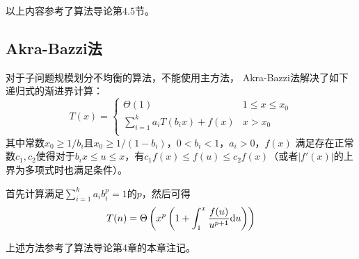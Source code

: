 以上内容参考了算法导论\cite{ITA3}第4.5节。
\subsection{Akra-Bazzi法}
对于子问题规模划分不均衡的算法，不能使用主方法，
Akra-Bazzi法解决了如下递归式的渐进界计算：
\begin{displaymath}
	T(x)=\left\{\begin{array}{ll}
		\Theta(1)                     & 1\leq x \leq x_0 \\
		\sum_{i=1}^k{a_iT(b_ix)}+f(x) & x>x_0            \\
	\end{array}\right.
\end{displaymath}
其中常数$x_0\geq 1/b_i$且$x_0 \geq 1/(1-b_i)$，$0<b_i<1$，$a_i>0$，$f(x)$
满足存在正常数$c_1,c_2$使得对于$b_ix\leq u \leq x$，有$c_1f(x)\leq f(u)
	\leq c_2f(x)$（或者$|f'(x)|$的上界为多项式时也满足条件）。

首先计算满足$\sum_{i=1}^k{a_ib_i^p}=1$的$p$，然后可得
\begin{displaymath}
	T(n)=\Theta\left(x^p\left(1+\int_1^x{\frac{f(u)}{u^{p+1}} \textrm{d} u}\right)\right)
\end{displaymath}

上述方法参考了算法导论\cite{ITA3}第4章的本章注记。
